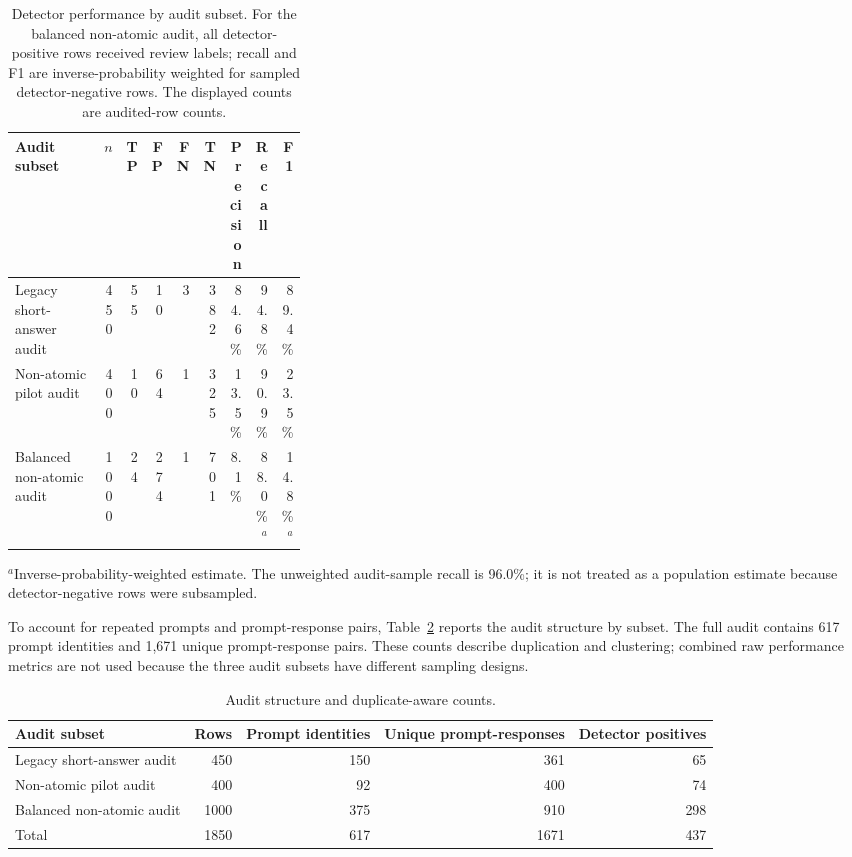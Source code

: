 \documentclass[11pt]{article}
\begin{document}
\begin{table}[H]
\centering
\small
\caption{Detector performance by audit subset. For the balanced non-atomic audit, all detector-positive rows received review labels; recall and F1 are inverse-probability weighted for sampled detector-negative rows. The displayed counts are audited-row counts.}
\label{tab:audit-performance}
\begin{tabular}{p{0.34\linewidth}rrrrrrrr}
\toprule
Audit subset & $n$ & TP & FP & FN & TN & Precision & Recall & F1\\
\midrule
Legacy short-answer audit & 450 & 55 & 10 & 3 & 382 & 84.6\% & 94.8\% & 89.4\%\\
Non-atomic pilot audit & 400 & 10 & 64 & 1 & 325 & 13.5\% & 90.9\% & 23.5\%\\
Balanced non-atomic audit & 1000 & 24 & 274 & 1 & 701 & 8.1\% & 88.0\%$^{a}$ & 14.8\%$^{a}$\\
\bottomrule
\end{tabular}
\begin{flushleft}
\footnotesize $^{a}$Inverse-probability-weighted estimate. The unweighted audit-sample recall is 96.0\%; it is not treated as a population estimate because detector-negative rows were subsampled.
\end{flushleft}
\end{table}

To account for repeated prompts and prompt-response pairs, Table~\ref{tab:audit-structure} reports the audit structure by subset. The full audit contains 617 prompt identities and 1,671 unique prompt-response pairs. These counts describe duplication and clustering; combined raw performance metrics are not used because the three audit subsets have different sampling designs.

\begin{table}[H]
\centering
\small
\caption{Audit structure and duplicate-aware counts.}
\label{tab:audit-structure}
\begin{tabular}{lrrrr}
\toprule
Audit subset & Rows & Prompt identities & Unique prompt-responses & Detector positives\\
\midrule
Legacy short-answer audit & 450 & 150 & 361 & 65\\
Non-atomic pilot audit & 400 & 92 & 400 & 74\\
Balanced non-atomic audit & 1000 & 375 & 910 & 298\\
\midrule
Total & 1850 & 617 & 1671 & 437\\
\bottomrule
\end{tabular}
\end{table}
\end{document}
